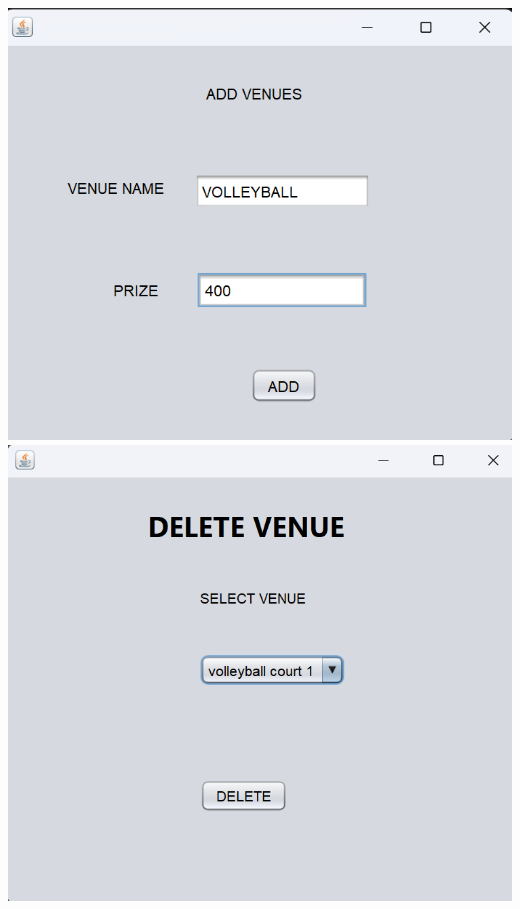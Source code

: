 \documentclass[a4paper,12pt]{report}
\begin{document}
\includegraphics[scale=0.5]{VENUES.png}
\includegraphics[scale=0.5]{DELETE_VENUE.png}
\end{document}
